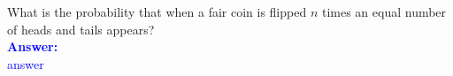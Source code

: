 \item{}
What is the probability that when a fair coin is flipped $n$ times an equal
number of heads and tails appears?\\[12pt]
\ifanswers
\textcolor{blue}{
\textbf{Answer:}\\[6pt]
answer
}
\newpage
\fi
